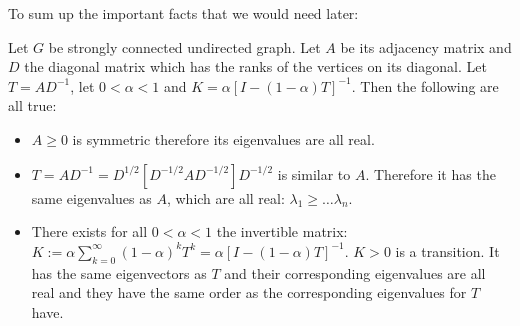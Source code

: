 To sum up the important facts that we would need later:

\begin{thm}
\label{Ax:thm:AKTcharacteristics}
Let $G$ be strongly connected undirected graph. Let $A$ be its adjacency matrix
and $D$ the diagonal matrix which has the ranks of the vertices on its diagonal.
Let $T = A D^{-1}$, let $0 \lt \alpha \lt 1$ and 
$K = \alpha [I - (1 - \alpha)T]^{-1}$. Then the following are all true:

\begin{itemize}

\item{}
$A \geq 0$ is symmetric therefore its eigenvalues are all real.

\item{}
$T = AD^{-1} = D^{1/2}[D^{-1/2}AD^{-1/2}]D^{-1/2}$ is similar to $A$. Therefore
it has the same eigenvalues as $A$, which are all real:
$\lambda_1 \geq \dots \lambda_n$.

\item{}
There exists for all $0 \lt \alpha \lt 1$ the invertible matrix: 
$K := \alpha \sum_{k=0}^{\infty} (1 - \alpha)^k T^k = \alpha [I - (1 -
\alpha)T]^{-1}$.
$K \gt 0$ is a transition. It has the same eigenvectors as $T$ and their
corresponding eigenvalues are all real and they have the same order as the
corresponding eigenvalues for $T$ have.
\end{itemize}
\end{thm}


